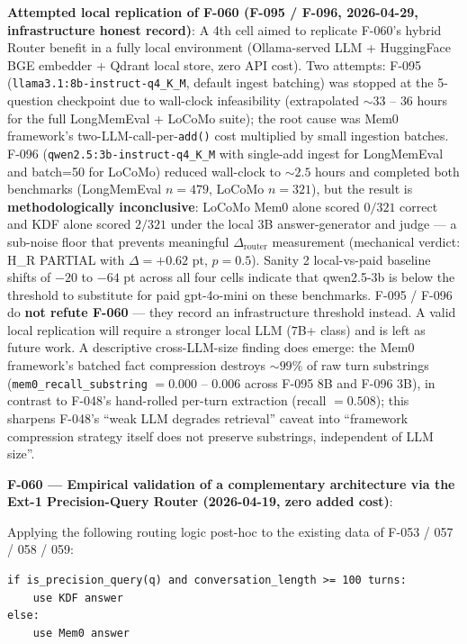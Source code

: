 \textbf{Attempted local replication of F-060 (F-095 / F-096, 2026-04-29, infrastructure honest record)}:
A 4th cell aimed to replicate F-060's hybrid Router benefit in a fully
local environment (Ollama-served LLM + HuggingFace BGE embedder + Qdrant
local store, zero API cost). Two attempts:
F-095 (\texttt{llama3.1:8b-instruct-q4\_K\_M}, default ingest batching) was stopped
at the 5-question checkpoint due to wall-clock infeasibility (extrapolated
\(\sim 33\) -- \(36\) hours for the full LongMemEval + LoCoMo suite); the
root cause was Mem0 framework's two-LLM-call-per-\texttt{add()} cost
multiplied by small ingestion batches. F-096 (\texttt{qwen2.5:3b-instruct-q4\_K\_M}
with single-add ingest for LongMemEval and batch=50 for LoCoMo) reduced
wall-clock to \(\sim 2.5\) hours and completed both benchmarks (LongMemEval
\(n=479\), LoCoMo \(n=321\)), but the result is \textbf{methodologically inconclusive}:
LoCoMo Mem0 alone scored \(0/321\) correct and KDF alone scored \(2/321\)
under the local 3B answer-generator and judge --- a sub-noise floor that
prevents meaningful \(\Delta_{\text{router}}\) measurement (mechanical
verdict: H\_R PARTIAL with \(\Delta = +0.62\) pt, \(p = 0.5\)). Sanity 2
local-vs-paid baseline shifts of \(-20\) to \(-64\) pt across all four cells
indicate that qwen2.5-3b is below the threshold to substitute for paid
gpt-4o-mini on these benchmarks. F-095 / F-096 do \textbf{not refute F-060} ---
they record an infrastructure threshold instead. A valid local replication
will require a stronger local LLM (\(7\)B+ class) and is left as
future work. A descriptive cross-LLM-size finding does emerge: the Mem0
framework's batched fact compression destroys \(\sim 99\%\) of raw turn
substrings (\texttt{mem0\_recall\_substring} \(= 0.000\) -- \(0.006\) across F-095
8B and F-096 3B), in contrast to F-048's hand-rolled per-turn extraction
(recall \(= 0.508\)); this sharpens F-048's ``weak LLM degrades retrieval''
caveat into ``framework compression strategy itself does not preserve
substrings, independent of LLM size''.

\textbf{F-060 --- Empirical validation of a complementary architecture via the Ext-1 Precision-Query Router (2026-04-19, zero added cost)}:

Applying the following routing logic post-hoc to the existing data of F-053 / 057 / 058 / 059:

\begin{verbatim}
if is_precision_query(q) and conversation_length >= 100 turns:
    use KDF answer
else:
    use Mem0 answer
\end{verbatim}

